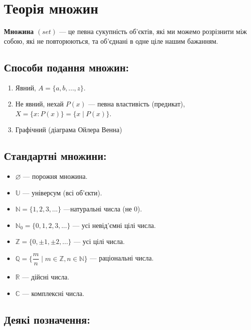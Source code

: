 \section{Теорія множин}

\begin{definition}
    \textbf{Множина $(set)$} --- це певна сукупність об'єктів, які ми можемо розрізнити між
    собою, які не повторюються, та об'єднані в одне ціле нашим бажанням.
\end{definition}

\subsection*{Способи подання множин:}

\begin{enumerate}
    \item Явний, $A = \{a, b, ..., z\}$.
    \item Не явний, нехай $P(x)$ --- певна властивість (предикат), $X = \{x: P(x)\} = \{x \mid P(x)\}$.
    \item Графічний (діаграма Ойлера Венна)
\end{enumerate}

\subsection*{Стандартні множини:}

\begin{itemize}
    \item $\varnothing$ --- порожня множина.
    \item $\mathbb{U}$ --- універсум (всі об'єкти).
    \item $\mathbb{N} = \{1, 2, 3, ...\}$ ---натуральні числа (не 0).
    \item $\mathbb{N}_0 = \{0, 1, 2, 3, ...\}$ --- усі невід'ємні цілі числа.
    \item $\mathbb{Z} = \{0, \pm 1, \pm 2, ...\}$ --- усі цілі числа.
    \item $\mathbb{Q} = \{\dfrac{m}{n} \mid m \in \mathbb{Z}, n \in \mathbb{N}\}$ --- раціональні числа.
    \item $\mathbb{R}$ --- дійсні числа.
    \item $\mathbb{C}$ --- комплексні числа.
\end{itemize}

\subsection*{Деякі позначення:}


